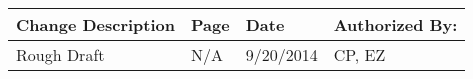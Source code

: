 
\begin{table}[H]
\begin{tabular}{|p{.4\linewidth}|l|l|l|}
\hline
\textbf{Change Description} & \textbf{Page}     & \textbf{Date} & \textbf{Authorized By:} \\ \hline
Rough Draft            & N/A                    & 9/20/2014     & CP, EZ                        \\ \hline

\end{tabular}
\end{table}
